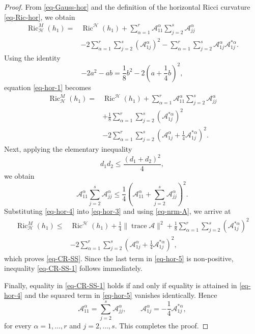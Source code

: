 \documentclass[10pt,a4paper]{article}
\theoremstyle{definition}
\theoremstyle{remark}
\numberwithin{equation}{section}
\begin{document}
\begin{proof}
From \eqref{eq-Gauss-hor} and the definition of the horizontal Ricci
curvature \eqref{eq-Ric-hor}, we obtain
\begin{align}
\operatorname{Ric}_{\mathcal H}^{M}(h_{1})
={}&
\operatorname{Ric}^{\mathcal H}(h_{1})
+\sum_{\alpha=1}^{r}
\mathcal A_{11}^{\alpha}
\sum_{j=2}^{s}\mathcal A_{jj}^{\alpha}
\nonumber\\
&-2\sum_{\alpha=1}^{r}\sum_{j=2}^{s}
(\mathcal A_{1j}^{\alpha})^{2}
-\sum_{\alpha=1}^{r}\sum_{j=2}^{s}
\mathcal A_{1j}^{\alpha}\mathcal A_{1j}^{*\alpha}.
\label{eq-hor-1}
\end{align}
Using the identity
\[
-2a^{2}-ab
=
\frac18b^{2}
-2\left(a+\frac14b\right)^{2},
\]
equation \eqref{eq-hor-1} becomes
\begin{align}
\operatorname{Ric}_{\mathcal H}^{M}(h_{1})
={}&
\operatorname{Ric}^{\mathcal H}(h_{1})
+\sum_{\alpha=1}^{r}
\mathcal A_{11}^{\alpha}
\sum_{j=2}^{s}\mathcal A_{jj}^{\alpha}
\nonumber\\
&+\frac18\sum_{\alpha=1}^{r}\sum_{j=2}^{s}
(\mathcal A_{1j}^{*\alpha})^{2}
\nonumber\\
&-2\sum_{\alpha=1}^{r}\sum_{j=2}^{s}
\left(
\mathcal A_{1j}^{\alpha}
+\frac14\mathcal A_{1j}^{*\alpha}
\right)^{2}.
\label{eq-hor-3}
\end{align}
Next, applying the elementary inequality
\[
d_{1}d_{2}
\leq
\frac{(d_{1}+d_{2})^{2}}{4},
\]
we obtain
\begin{equation}
\mathcal A_{11}^{\alpha}
\sum_{j=2}^{s}\mathcal A_{jj}^{\alpha}
\leq
\frac14
\left(
\mathcal A_{11}^{\alpha}
+\sum_{j=2}^{s}\mathcal A_{jj}^{\alpha}
\right)^{2}.
\label{eq-hor-4}
\end{equation}
Substituting \eqref{eq-hor-4} into \eqref{eq-hor-3} and using
\eqref{eq-nrm-A}, we arrive at
\begin{align}
\operatorname{Ric}_{\mathcal H}^{M}(h_{1})
\leq{}&
\operatorname{Ric}^{\mathcal H}(h_{1})
+\frac14\|\operatorname{trace}\mathcal A\|^{2}
+\frac18\sum_{\alpha=1}^{r}\sum_{j=2}^{s}
(\mathcal A_{1j}^{*\alpha})^{2}
\nonumber\\
&-2\sum_{\alpha=1}^{r}\sum_{j=2}^{s}
\left(
\mathcal A_{1j}^{\alpha}
+\frac14\mathcal A_{1j}^{*\alpha}
\right)^{2},
\label{eq-hor-5}
\end{align}
which proves \eqref{eq-CR-SS}. Since the last term in \eqref{eq-hor-5} is non-positive, inequality
\eqref{eq-CR-SS-1} follows immediately.

Finally, equality in \eqref{eq-CR-SS-1} holds if and only if equality is
attained in \eqref{eq-hor-4} and the squared term in
\eqref{eq-hor-5} vanishes identically. Hence
\[
\mathcal A_{11}^{\alpha}
=
\sum_{j=2}^{s}\mathcal A_{jj}^{\alpha},
\qquad
\mathcal A_{1j}^{\alpha}
=
-\frac14\mathcal A_{1j}^{*\alpha},
\]
for every $\alpha=1,\ldots,r$ and $j=2,\ldots,s$. This completes the
proof.
\end{proof}
\end{document}
